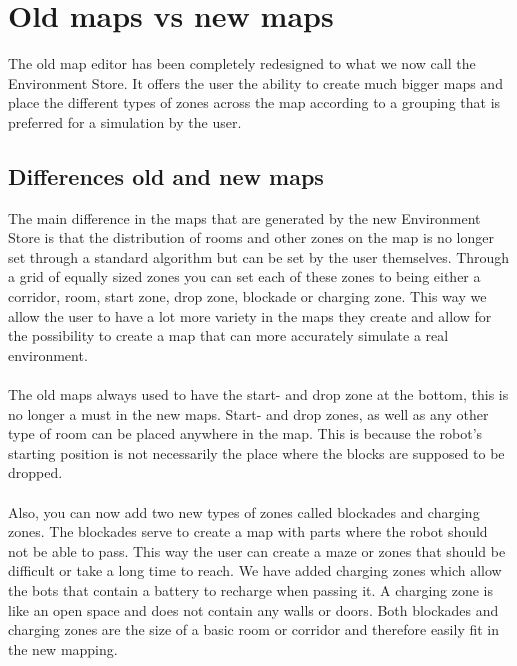 \section{Old maps vs new maps}
The old map editor has been completely redesigned to what we now call the Environment Store. 
It offers the user the ability to create much bigger maps and place the different types of zones 
across the map according to a grouping that is preferred for a simulation by the user.

\subsection{Differences old and new maps}
The main difference in the maps that are generated by the new Environment Store is that the distribution
of rooms and other zones on the map is no longer set through a standard algorithm but can be set by the user themselves.
Through a grid of equally sized zones you can set each of these zones to being either a corridor, room, start zone, drop zone, blockade or charging zone.
This way we allow the user to have a lot more variety in the maps they create and allow for the possibility to
create a map that can more accurately simulate a real environment.
\\
\\
The old maps always used to have the start- and drop zone at the bottom, this is no longer a must in the new maps.
Start- and drop zones, as well as any other type of room can be placed anywhere in the map. This is because the
robot's starting position is not necessarily the place where the blocks are supposed to be dropped.
\\
\\
Also, you can now add two new types of zones called blockades and charging zones. 
The blockades serve to create a map with parts where the robot should not be able to pass.
This way the user can create a maze or zones that should be difficult or take a long time to reach. 
We have added charging zones which allow the bots that contain a battery to recharge when passing it. 
A charging zone is like an open space and does not contain any walls or doors. Both blockades and 
charging zones are the size of a basic room or corridor and therefore easily fit in the new mapping.


